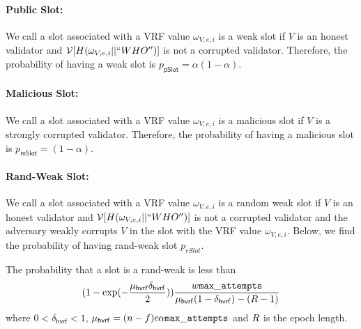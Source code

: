 

\paragraph{Public Slot:} We call a slot associated with a VRF value $ \omega_{V,e,i} $ is a weak slot  if $ V $ is an honest validator and $ \mathcal{V}[H(\omega_{V,e,i}||``WHO'')] $ is not a corrupted validator. Therefore, the probability of having a weak slot is $ p_{\mathsf{pSlot}} = \alpha (1-\alpha) $.  

\paragraph{Malicious Slot:}  We call a slot associated with a VRF value $ \omega_{V,e,i} $ is a malicious slot  if $ V $ is a strongly corrupted validator. Therefore, the probability of having a malicious slot is $ p_{\mathsf{mSlot}} =  (1-\alpha) $.  



\paragraph{Rand-Weak Slot:} We call a slot associated with a VRF value $ \omega_{V,e,i} $ is a random weak slot  if $ V $ is an honest validator and $ \mathcal{V}[H(\omega_{V,e,i}||``WHO'')] $ is not a corrupted validator and the adversary weakly corrupts $ V $ in the slot with the VRF value $ \omega_{V,e,i} $.  Below, we find the probability of having rand-weak slot $ p_{rSlot} $.

\begin{lemma}
	The probability that a slot is a rand-weak is less than $$(1 - \exp(-\frac{\mu_{\mathsf{hvrf}}\delta_{\mathsf{hvrf}}}{2}))\frac{w \mathtt{max\_attempts} }{\mu_{\mathsf{hvrf}} (1- \delta_{\mathsf{hvrf}}) - (R  -1)} $$ where $ 0 < \delta_{\mathsf{hvrf}} < 1 $, $ \mu_{\mathsf{hvrf}} = (n-f)c\alpha\mathtt{max\_attempts} $ and  $ R  $ is the epoch length.
\end{lemma}

